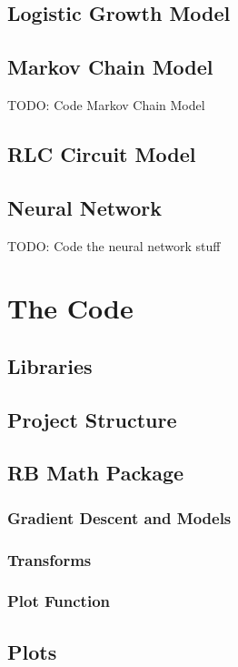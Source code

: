 \documentclass{report}
\begin{document}
        \subsection{Logistic Growth Model}
        \subsection{Markov Chain Model}
            TODO: Code Markov Chain Model
        \subsection{RLC Circuit Model}
        \subsection{Neural Network}
            TODO: Code the neural network stuff
    \section{The Code}
        \subsection{Libraries}
        \subsection{Project Structure}
        \subsection{RB Math Package}
            \subsubsection{Gradient Descent and Models}
            \subsubsection{Transforms}
            \subsubsection{Plot Function}
        \subsection{Plots}
\end{document}

